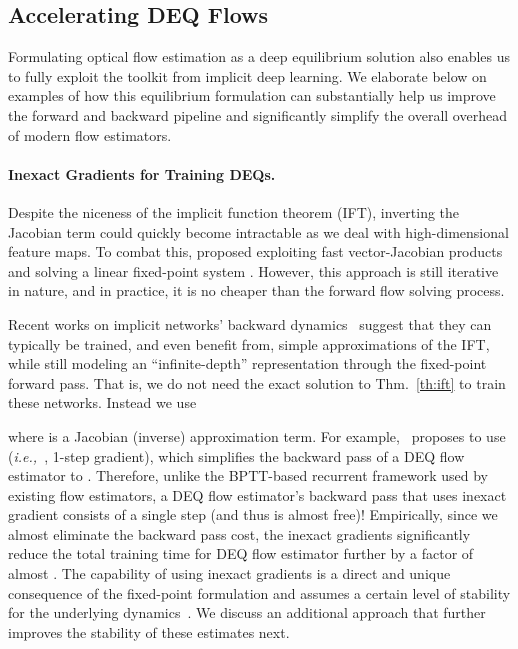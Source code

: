 \documentclass[10pt,twocolumn,letterpaper]{article}
\def\ie{\textit{i.e.,~}}
\begin{document}
\subsection{Accelerating DEQ Flows}
\label{subsec:accelerate-deq-flow}
Formulating optical flow estimation as a deep equilibrium solution also enables us to fully exploit the toolkit from implicit deep learning. We elaborate below on examples of how this equilibrium formulation can substantially help us improve the forward and backward pipeline and significantly simplify the overall overhead of modern flow estimators.

\vspace{-.5cm}
\paragraph{Inexact Gradients for Training DEQs.} Despite the niceness of the implicit function theorem (IFT), inverting the Jacobian term could quickly become intractable as we deal with high-dimensional feature maps. To combat this, \citet{DEQ} proposed exploiting fast vector-Jacobian products and solving a linear fixed-point system . However, this approach is still iterative in nature, and in practice, it is no cheaper than the forward flow solving process.

Recent works on implicit networks' backward dynamics~\cite{Ham,SamyFPN,PhantomGrad} suggest that they can typically be trained, and even benefit from, simple approximations of the IFT, while still modeling an ``infinite-depth'' representation through the fixed-point forward pass. That is, we do not need the exact solution to Thm.~\ref{th:ift} to train these networks. Instead we use

where  is a Jacobian (inverse) approximation term. For example,~\cite{Ham,SamyFPN} proposes to use  (\ie, 1-step gradient), which simplifies the backward pass of a DEQ flow estimator to . Therefore, unlike the BPTT-based recurrent framework used by existing flow estimators, a DEQ flow estimator's backward pass that uses inexact gradient consists of a single step (and thus is almost free)! Empirically, since we almost eliminate the backward pass cost, the inexact gradients significantly reduce the total training time for DEQ flow estimator further by a factor of almost . The capability of using inexact gradients is a direct and unique consequence of the fixed-point formulation and assumes a certain level of stability for the underlying dynamics~\cite{Ham,SamyFPN,PhantomGrad,DEQ_JR}. We discuss an additional approach that further improves the stability of these estimates next.
\end{document}
